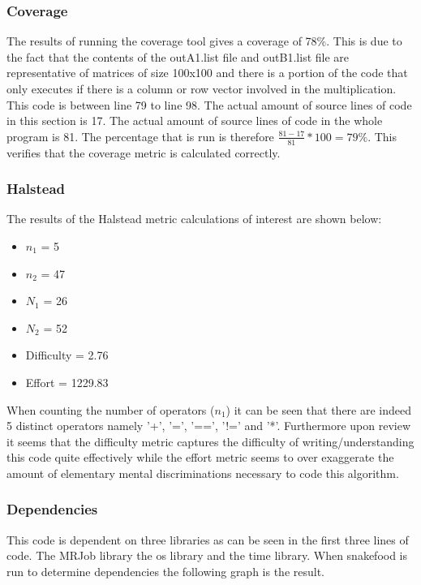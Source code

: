 \documentclass[10.5pt,journal, a4paper]{IEEEtran}
\begin{document}
\subsubsection{Coverage}
\noindent
The results of running the coverage tool gives a coverage of 78\%. This is due to the fact that the contents of the outA1.list file and outB1.list file are representative of matrices of size 100x100 and there is a portion of the code that only executes if there is a column or row vector involved in the multiplication. This code is between line 79 to line 98. The actual amount of source lines of code in this section is 17. The actual amount of source lines of code in the whole program is 81. The percentage that is run is therefore $\frac{81-17}{81}*100 = 79\% $. This verifies that the coverage metric is calculated correctly. 



\subsubsection{Halstead}
\noindent
The results of the Halstead metric calculations of interest are shown below:
\begin{itemize}
\item $n_{1}$ = 5
\item $n_{2}$ = 47
\item $N_{1}$ = 26
\item $N_{2}$ = 52
\item Difficulty = 2.76
\item Effort = 1229.83
\end{itemize}

\noindent
When counting the number of operators ($n_{1}$) it can be seen that there are indeed 5 distinct operators namely '+', '=', '==', '!=' and '*'. Furthermore upon review it seems that the difficulty metric captures the difficulty of writing/understanding this code quite effectively while the effort metric seems to over exaggerate the amount of elementary mental discriminations necessary to code this algorithm. 

\subsubsection{Dependencies}
\noindent
This code is dependent on three libraries as can be seen in the first three lines of code. The MRJob library the os library and the time library. When snakefood is run to determine dependencies the following graph is the result. 
\end{document}
